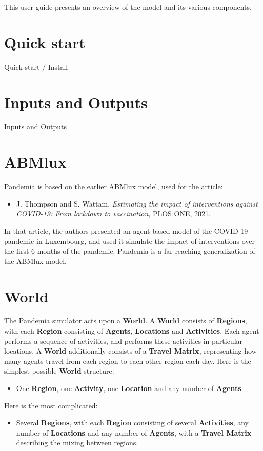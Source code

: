 \documentclass[10pt,letterpaper]{article}
\begin{document}
This user guide presents an overview of the model and its various components.

\section{Quick start}

Quick start / Install

\section{Inputs and Outputs}

Inputs and Outputs

\section{ABMlux}

Pandemia is based on the earlier ABMlux model, used for the article:
\begin{itemize}
\item[] J. Thompson and S. Wattam, \textit{Estimating the impact of interventions against COVID-19: From lockdown to vaccination}, PLOS ONE, 2021.
\end{itemize}
In that article, the authors presented an agent-based model of the COVID-19 pandemic in Luxembourg, and used it simulate the impact of interventions over the first 6 months of the pandemic. Pandemia is a far-reaching generalization of the ABMlux model. 

\section{World}

The Pandemia simulator acts upon a \textbf{World}. A \textbf{World} consists of \textbf{Regions}, with each \textbf{Region} consisting of \textbf{Agents}, \textbf{Locations} and \textbf{Activities}. Each agent performs a sequence of activities, and performs these activities in particular locations. A \textbf{World} additionally consists of a \textbf{Travel Matrix}, representing how many agents travel from each region to each other region each day. Here is the simplest possible \textbf{World} structure:
\begin{itemize}
\item One \textbf{Region}, one \textbf{Activity}, one \textbf{Location} and any number of \textbf{Agents}.
\end{itemize}
Here is the most complicated:
\begin{itemize}
\item Several \textbf{Regions}, with each \textbf{Region} consisting of several \textbf{Activities}, any number of \textbf{Locations} and any number of \textbf{Agents}, with a \textbf{Travel Matrix} describing the mixing between regions.
\end{itemize}
\end{document}
